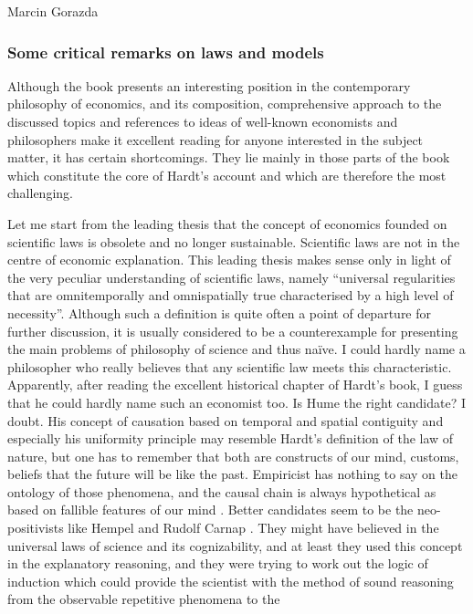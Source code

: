 \begin{recengenv}{Marcin Gorazda}
\subsubsection{Some critical remarks on laws and models}
Although the book presents an interesting position in the contemporary philosophy of economics, and its composition,
comprehensive approach to the discussed topics and references to ideas of well-known economists and philosophers make
it excellent reading for anyone interested in the subject matter, it has certain shortcomings. They lie mainly in those
parts of the book which constitute the core of Hardt’s account and which are therefore the most challenging.  

Let me start from the leading thesis that the concept of economics founded on scientific laws is obsolete and no longer
sustainable. Scientific laws are not in the centre of economic explanation. This leading thesis makes sense only in
light of the very peculiar understanding of scientific laws, namely ``universal regularities that are omnitemporally and
omnispatially true characterised by a high level of necessity''. Although such a definition is quite often a point of
departure for further discussion, it is usually considered to be a counterexample for presenting the main problems of
philosophy of science and thus naïve. I could hardly name a philosopher who really believes that any scientific law
meets this characteristic. Apparently, after reading the excellent historical chapter of Hardt’s book, I guess that he
could hardly name such an economist too. Is Hume the right candidate? I doubt. His concept of causation based on
temporal and spatial contiguity and especially his uniformity principle may resemble Hardt’s definition of the law of
nature, but one has to remember that both are constructs of our mind,  customs, beliefs that the future will be like the
past. Empiricist has nothing to say on the ontology of those phenomena, and the causal chain is always hypothetical as
based on fallible features of our mind
\parencite{hume_treatise_2000}.
Better candidates seem to be the
neo-positivists like Hempel
\parencite{hempel_studies_1948}
and Rudolf Carnap
\parencite*{carnap_logical_1967}.
They might have believed in the universal laws of science and its cognizability, and
at least they used this concept in the explanatory reasoning, and they were trying to work out the logic of induction
which could provide the scientist with the method of sound reasoning from the observable repetitive phenomena to the

\end{recengenv}
